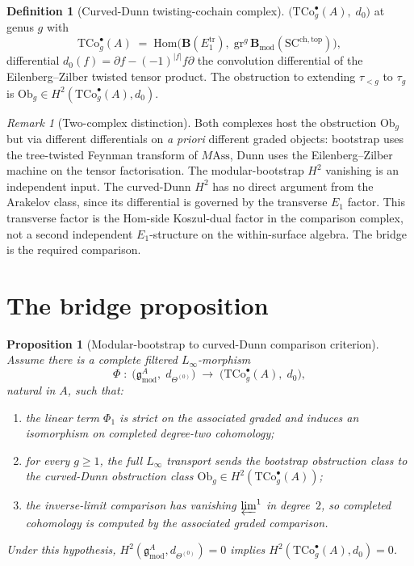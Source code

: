 \documentclass[11pt]{amsart}
\newtheorem{proposition}[theorem]{Proposition}
\theoremstyle{definition}
\newtheorem{definition}[theorem]{Definition}
\theoremstyle{remark}
\newtheorem{remark}[theorem]{Remark}
\providecommand{\Bmod}{\mathbf{B}_{\mathrm{mod}}}
\begin{document}
\begin{definition}[Curved-Dunn twisting-cochain complex]%
\label{def:curved-dunn-complex-standalone}%
$\bigl(\mathrm{TCo}^\bullet_g(A),\; d_0\bigr)$ at genus $g$ with
\[
  \mathrm{TCo}^\bullet_g(A)
  \;=\; \mathrm{Hom}\!\bigl(
     \mathbf{B}(E_1^{\mathrm{tr}}),\;
     \mathrm{gr}^g\,\Bmod(\mathrm{SC}^{\mathrm{ch,top}})\bigr),
\]
differential $d_0(f) = \partial f - (-1)^{|f|} f \partial$ the
convolution differential of the Eilenberg--Zilber twisted tensor
product. The obstruction to extending
$\tau_{<g}$ to $\tau_g$ is
$\mathrm{Ob}_g \in H^2(\mathrm{TCo}^\bullet_g(A), d_0)$.
\end{definition}

\begin{remark}[Two-complex distinction]%
\label{rem:fm67-two-complex}%
Both complexes host the obstruction $\mathrm{Ob}_g$ but via different
differentials on \emph{a priori} different graded objects:
bootstrap uses the tree-twisted Feynman transform of
$M\mathrm{Ass}$, Dunn uses the Eilenberg--Zilber machine on the
tensor factorisation. The modular-bootstrap $H^2$ vanishing is an
independent input.  The curved-Dunn $H^2$ has no direct argument from
the Arakelov class, since its differential is governed by the
transverse $E_1$ factor. This transverse factor is the Hom-side
Koszul-dual factor in the comparison complex, not a second
independent $E_1$-structure on the within-surface algebra. The bridge
is the required comparison.
\end{remark}

\section{The bridge proposition}
\label{sec:bridge-cd-standalone}

\begin{proposition}[Modular-bootstrap to curved-Dunn comparison criterion]%
\label{prop:modular-bootstrap-to-curved-dunn-bridge-standalone}%
Assume there is a complete filtered \(L_\infty\)-morphism
\[
  \Phi \;:\;
  \bigl(\mathfrak{g}^A_{\mathrm{mod}},\; d_{\Theta^{(0)}}\bigr)
  \;\longrightarrow\;
  \bigl(\mathrm{TCo}^\bullet_g(A),\; d_0\bigr),
\]
natural in $A$, such that:
\begin{enumerate}[label=\textup{(\roman*)}]
\item the linear term \(\Phi_1\) is strict on the associated graded
  and induces an isomorphism on completed degree-two cohomology;
\item for every $g \ge 1$, the full \(L_\infty\) transport sends the
  bootstrap obstruction class to the curved-Dunn obstruction class
  \(\mathrm{Ob}_g \in H^2(\mathrm{TCo}^\bullet_g(A))\);
\item the inverse-limit comparison has vanishing \(\varprojlim^1\) in
  degree~$2$, so completed cohomology is computed by the associated
  graded comparison.
\end{enumerate}
Under this hypothesis,
$H^2(\mathfrak{g}^A_{\mathrm{mod}}, d_{\Theta^{(0)}}) = 0$ implies
$H^2(\mathrm{TCo}^\bullet_g(A), d_0) = 0$.
\end{proposition}
\end{document}
